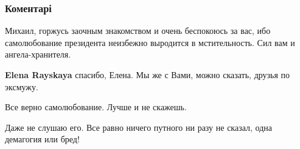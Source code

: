  
 
 
 
 
\subsubsection{Коментарі}

\begin{itemize}
 

Михаил, горжусь заочным знакомством и очень беспокоюсь за вас, ибо
самолюбование президента неизбежно выродится в мстительность. Сил вам и
ангела-хранителя.

\begin{itemize}
 
\textbf{Elena Rayskaya} спасибо, Елена. Мы же с Вами, можно сказать, друзья по эксмужу.

 
Все верно самолюбование. Лучше и не скажешь.
\end{itemize}

 
Даже не слушаю его. Все равно ничего путного ни разу не сказал, одна демагогия или бред!


\end{itemize}
